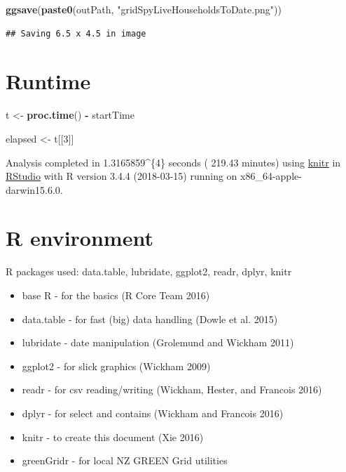 \documentclass[]{article}
\newenvironment{Shaded}{\begin{snugshade}}{\end{snugshade}}
\newcommand{\KeywordTok}[1]{\textcolor[rgb]{0.13,0.29,0.53}{\textbf{#1}}}
\newcommand{\DecValTok}[1]{\textcolor[rgb]{0.00,0.00,0.81}{#1}}
\newcommand{\StringTok}[1]{\textcolor[rgb]{0.31,0.60,0.02}{#1}}
\newcommand{\OperatorTok}[1]{\textcolor[rgb]{0.81,0.36,0.00}{\textbf{#1}}}
\newcommand{\NormalTok}[1]{#1}
\providecommand{\tightlist}{%
  \setlength{\itemsep}{0pt}\setlength{\parskip}{0pt}}
\begin{document}
\begin{Shaded}
\begin{Highlighting}[]
\KeywordTok{ggsave}\NormalTok{(}\KeywordTok{paste0}\NormalTok{(outPath, }\StringTok{"gridSpyLiveHouseholdsToDate.png"}\NormalTok{))}
\end{Highlighting}
\end{Shaded}

\begin{verbatim}
## Saving 6.5 x 4.5 in image
\end{verbatim}

\section{Runtime}\label{runtime}

\begin{Shaded}
\begin{Highlighting}[]
\NormalTok{t <-}\StringTok{ }\KeywordTok{proc.time}\NormalTok{() }\OperatorTok{-}\StringTok{ }\NormalTok{startTime}

\NormalTok{elapsed <-}\StringTok{ }\NormalTok{t[[}\DecValTok{3}\NormalTok{]]}
\end{Highlighting}
\end{Shaded}

Analysis completed in 1.3165859\^{}\{4\} seconds ( 219.43
minutes) using \href{https://cran.r-project.org/package=knitr}{knitr} in
\href{http://www.rstudio.com}{RStudio} with R version 3.4.4 (2018-03-15)
running on x86\_64-apple-darwin15.6.0.

\section{R environment}\label{r-environment}

R packages used: data.table, lubridate, ggplot2, readr, dplyr, knitr

\begin{itemize}
\tightlist
\item
  base R - for the basics (R Core Team 2016)
\item
  data.table - for fast (big) data handling (Dowle et al. 2015)
\item
  lubridate - date manipulation (Grolemund and Wickham 2011)
\item
  ggplot2 - for slick graphics (Wickham 2009)
\item
  readr - for csv reading/writing (Wickham, Hester, and Francois 2016)
\item
  dplyr - for select and contains (Wickham and Francois 2016)
\item
  knitr - to create this document (Xie 2016)
\item
  greenGridr - for local NZ GREEN Grid utilities
\end{itemize}
\end{document}
